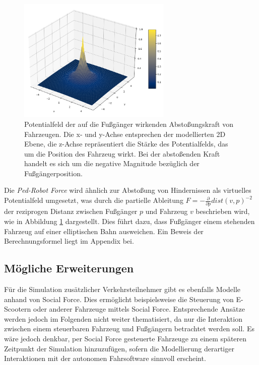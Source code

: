 \begin{figure}[h]
  \centering
  \includegraphics[width = 0.65\textwidth]{imgs/robot_repulsive_field}
  \caption{Potentialfeld der auf die Fußgänger wirkenden Abstoßungskraft von Fahrzeugen.
  Die x- und y-Achse entsprechen der modellierten 2D Ebene, die z-Achse repräsentiert
  die Stärke des Potentialfelds, das um die Position des Fahrzeug wirkt. Bei der
  abstoßenden Kraft handelt es sich um die negative Magnitude bezüglich der Fußgängerposition.}
  \label{img:PedRobotForce}
\end{figure}

Die \emph{Ped-Robot Force} wird ähnlich zur Abstoßung von Hindernissen als virtuelles
Potentialfeld umgesetzt, was durch die partielle Ableitung
$F = - \frac{\partial}{\partial p} dist(v, p)^{-2}$ der reziprogen Distanz zwischen
Fußgänger $p$ und Fahrzeug $v$ beschrieben wird, wie in Abbildung \ref{img:PedRobotForce}
dargestellt. Dies führt dazu, dass Fußgänger einem stehenden Fahrzeug auf einer
elliptischen Bahn ausweichen. Ein Beweis der Berechnungsformel liegt im Appendix bei.

\subsection{Mögliche Erweiterungen}
Für die Simulation zusätzlicher Verkehrsteilnehmer gibt es ebenfalls Modelle anhand
von Social Force. Dies ermöglicht beispielsweise die Steuerung von E-Scootern
\cite{liu2022scootersf} oder anderer Fahrzeuge \cite{huynh2014modelling} mittels
Social Force. Entsprechende Ansätze werden jedoch im Folgenden nicht weiter thematisiert,
da nur die Interaktion zwischen einem steuerbaren Fahrzeug und Fußgängern betrachtet werden soll.
Es wäre jedoch denkbar, per Social Force gesteuerte Fahrzeuge zu einem späteren Zeitpunkt
der Simulation hinzuzufügen, sofern die Modellierung derartiger Interaktionen mit der
autonomen Fahrsoftware sinnvoll erscheint.
